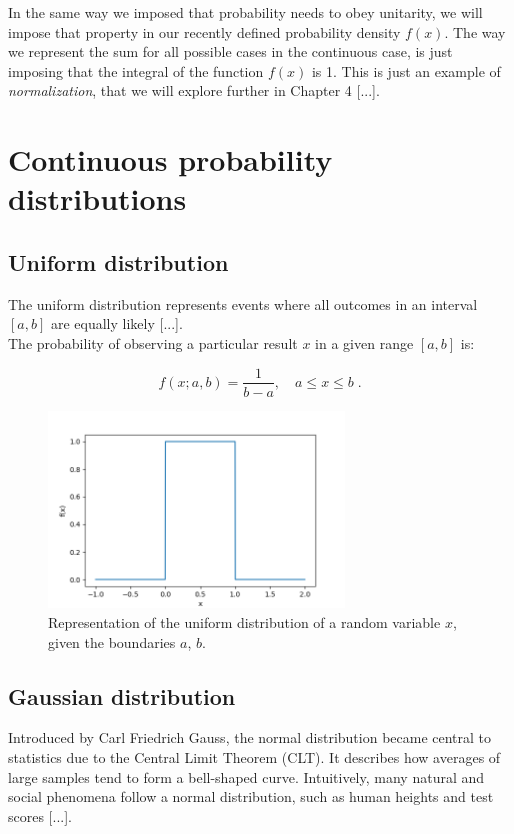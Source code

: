 \documentclass{book}
\begin{document}
In the same way we imposed that probability needs to obey unitarity, we will impose that property in our recently defined probability density $f(x)$. The way we represent the sum for all possible cases in the continuous case, is just imposing that the integral of the function $f(x)$ is 1. This is just an example of \textit{normalization}, that we will explore further in Chapter 4 [...].

\newpage

\section{Continuous probability distributions}

\subsection{Uniform distribution}

The uniform distribution represents events where all outcomes in an interval $[a, b]$ are equally likely [...].\\

The probability of observing a particular result $x$ in a given range $[a, b]$ is:

\begin{equation}
    f(x; a, b) = \frac{1}{b-a}, \quad a \leq x \leq b \; .
\end{equation}

\begin{figure}[ht]
    \centering
    \includegraphics[width=0.7\textwidth]{figures/chapter2/uniform.png}
    \caption{Representation of the uniform distribution of a random variable $x$, given the boundaries $a$, $b$.}
    \label{fig:uniform1}
\end{figure}

\newpage

\subsection{Gaussian distribution}
Introduced by Carl Friedrich Gauss, the normal distribution became central to statistics due to the Central Limit Theorem (CLT). It describes how averages of large samples tend to form a bell-shaped curve. Intuitively, many natural and social phenomena follow a normal distribution, such as human heights and test scores [...].\\
\end{document}
